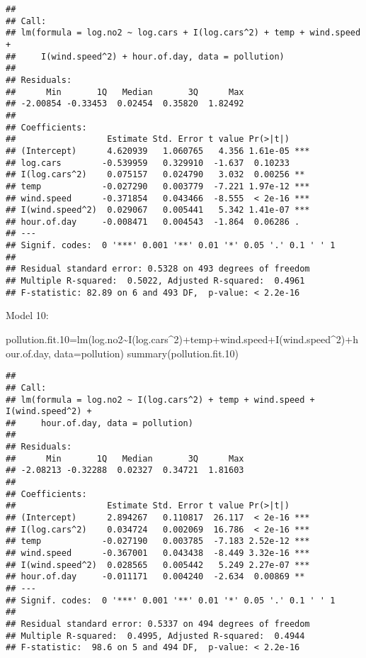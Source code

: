 \documentclass[
]{article}
\newenvironment{Shaded}{\begin{snugshade}}{\end{snugshade}}
\newcommand{\AttributeTok}[1]{\textcolor[rgb]{0.77,0.63,0.00}{#1}}
\newcommand{\DecValTok}[1]{\textcolor[rgb]{0.00,0.00,0.81}{#1}}
\newcommand{\FloatTok}[1]{\textcolor[rgb]{0.00,0.00,0.81}{#1}}
\newcommand{\FunctionTok}[1]{\textcolor[rgb]{0.00,0.00,0.00}{#1}}
\newcommand{\NormalTok}[1]{#1}
\newcommand{\OtherTok}[1]{\textcolor[rgb]{0.56,0.35,0.01}{#1}}
\newcommand{\SpecialCharTok}[1]{\textcolor[rgb]{0.00,0.00,0.00}{#1}}
\begin{document}
\begin{verbatim}
## 
## Call:
## lm(formula = log.no2 ~ log.cars + I(log.cars^2) + temp + wind.speed + 
##     I(wind.speed^2) + hour.of.day, data = pollution)
## 
## Residuals:
##      Min       1Q   Median       3Q      Max 
## -2.00854 -0.33453  0.02454  0.35820  1.82492 
## 
## Coefficients:
##                  Estimate Std. Error t value Pr(>|t|)    
## (Intercept)      4.620939   1.060765   4.356 1.61e-05 ***
## log.cars        -0.539959   0.329910  -1.637  0.10233    
## I(log.cars^2)    0.075157   0.024790   3.032  0.00256 ** 
## temp            -0.027290   0.003779  -7.221 1.97e-12 ***
## wind.speed      -0.371854   0.043466  -8.555  < 2e-16 ***
## I(wind.speed^2)  0.029067   0.005441   5.342 1.41e-07 ***
## hour.of.day     -0.008471   0.004543  -1.864  0.06286 .  
## ---
## Signif. codes:  0 '***' 0.001 '**' 0.01 '*' 0.05 '.' 0.1 ' ' 1
## 
## Residual standard error: 0.5328 on 493 degrees of freedom
## Multiple R-squared:  0.5022, Adjusted R-squared:  0.4961 
## F-statistic: 82.89 on 6 and 493 DF,  p-value: < 2.2e-16
\end{verbatim}

Model 10:

\begin{Shaded}
\begin{Highlighting}[]
\NormalTok{pollution.fit}\FloatTok{.10}\OtherTok{=}\FunctionTok{lm}\NormalTok{(log.no2}\SpecialCharTok{\textasciitilde{}}\FunctionTok{I}\NormalTok{(log.cars}\SpecialCharTok{\^{}}\DecValTok{2}\NormalTok{)}\SpecialCharTok{+}\NormalTok{temp}\SpecialCharTok{+}\NormalTok{wind.speed}\SpecialCharTok{+}\FunctionTok{I}\NormalTok{(wind.speed}\SpecialCharTok{\^{}}\DecValTok{2}\NormalTok{)}\SpecialCharTok{+}\NormalTok{hour.of.day, }\AttributeTok{data=}\NormalTok{pollution)}
\FunctionTok{summary}\NormalTok{(pollution.fit}\FloatTok{.10}\NormalTok{)}
\end{Highlighting}
\end{Shaded}

\begin{verbatim}
## 
## Call:
## lm(formula = log.no2 ~ I(log.cars^2) + temp + wind.speed + I(wind.speed^2) + 
##     hour.of.day, data = pollution)
## 
## Residuals:
##      Min       1Q   Median       3Q      Max 
## -2.08213 -0.32288  0.02327  0.34721  1.81603 
## 
## Coefficients:
##                  Estimate Std. Error t value Pr(>|t|)    
## (Intercept)      2.894267   0.110817  26.117  < 2e-16 ***
## I(log.cars^2)    0.034724   0.002069  16.786  < 2e-16 ***
## temp            -0.027190   0.003785  -7.183 2.52e-12 ***
## wind.speed      -0.367001   0.043438  -8.449 3.32e-16 ***
## I(wind.speed^2)  0.028565   0.005442   5.249 2.27e-07 ***
## hour.of.day     -0.011171   0.004240  -2.634  0.00869 ** 
## ---
## Signif. codes:  0 '***' 0.001 '**' 0.01 '*' 0.05 '.' 0.1 ' ' 1
## 
## Residual standard error: 0.5337 on 494 degrees of freedom
## Multiple R-squared:  0.4995, Adjusted R-squared:  0.4944 
## F-statistic:  98.6 on 5 and 494 DF,  p-value: < 2.2e-16
\end{verbatim}
\end{document}
